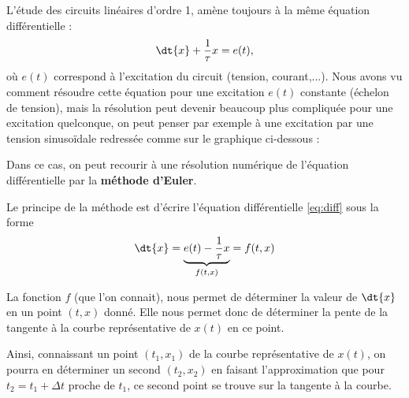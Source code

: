 \documentclass{cours}
\begin{document}
L'étude des circuits linéaires d'ordre 1, amène toujours à la même équation différentielle :
\begin{equation}
  \dt{x} + \frac{1}{\tau}x = e(t),
  \label{eq:diff}
\end{equation}
où $e(t)$ correspond à l'excitation du circuit (tension, courant,...). 
Nous avons vu comment résoudre cette équation pour une excitation $e(t)$ constante (échelon de tension), mais la résolution peut devenir beaucoup plus compliquée pour une excitation quelconque, on peut penser par exemple à une excitation par une tension sinusoïdale redressée comme sur le graphique ci-dessous : 
\begin{center}
\end{center}
Dans ce cas, on peut recourir à une résolution numérique de l'équation différentielle par la \textbf{méthode d'Euler}.

Le principe de la méthode est d'écrire l'équation différentielle \eqref{eq:diff} sous la forme
\begin{equation}
  \dt{x} = \underbrace{e(t) - \frac{1}{\tau}x}_{f(t, x)} = f(t, x)
\end{equation}

La fonction $f$ (que l'on connait), nous permet de déterminer la valeur de $\dt{x}$ en un point $(t, x)$ donné. Elle nous permet donc de déterminer la pente de la tangente à la courbe représentative de $x(t)$ en ce point.

Ainsi, connaissant un point $(t_1, x_1)$ de la courbe représentative de $x(t)$, on pourra en déterminer un second $(t_2, x_2)$ en faisant l'approximation que pour $t_2 = t_1 + \Delta t$ proche de $t_1$, ce second point se trouve sur la tangente à la courbe.
\end{document}
